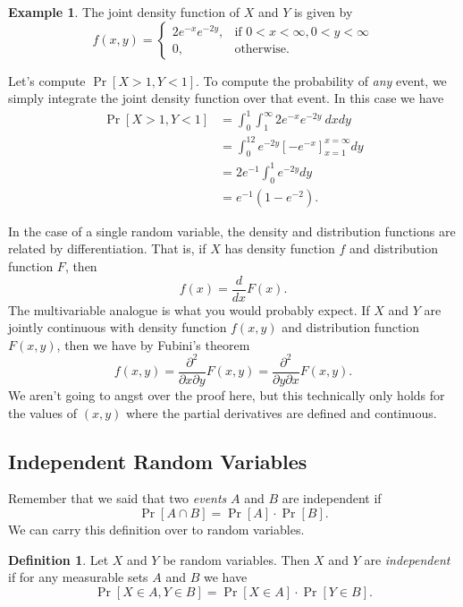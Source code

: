 \documentclass[12pt]{article}
\theoremstyle{plain}
\theoremstyle{definition}
\newtheorem{definition}[theorem]{Definition}
\newtheorem{example}[theorem]{Example}
\theoremstyle{remark}
\begin{document}
\begin{example}
    The joint density function of $X$ and $Y$ is given by
    \[
        f(x,y) = \begin{cases}
            2e^{-x}e^{-2y},&\text{if }0<x<\infty, 0<y<\infty\\
            0,&\text{otherwise.}
        \end{cases}
    \]

    Let's compute $\Pr[X>1, Y<1]$.
    To compute the probability of \emph{any} event, we simply integrate the joint density function over that event.
    In this case we have
    \begin{align*}
        \Pr[X > 1, Y< 1] &= \int_0^1\int_1^\infty2e^{-x}e^{-2y}\ dxdy\\
        &= \int_0^12e^{-2y}\left[-e^{-x}\right]_{x=1}^{x=\infty}dy\\
        &= 2e^{-1}\int_0^1e^{-2y}dy\\
        &= e^{-1}(1-e^{-2}).
    \end{align*}
\end{example}

In the case of a single random variable, the density and distribution functions are related by differentiation.
That is, if $X$ has density function $f$ and distribution function $F$, then
\[
    f(x) = \frac{d}{dx}F(x).
\]
The multivariable analogue is what you would probably expect.
If $X$ and $Y$ are jointly continuous with density function $f(x,y)$ and distribution function $F(x,y)$, then we have by Fubini's theorem
\begin{equation}\label{derivative of distribution is density}
    f(x,y) = \frac{\partial^2}{\partial x \partial y}F(x,y) = \frac{\partial^2}{\partial y\partial x}F(x,y).
\end{equation}
We aren't going to angst over the proof here, but this technically only holds for the values of $(x,y)$ where the partial derivatives are defined and continuous.










\subsection{Independent Random Variables}
Remember that we said that two \emph{events} $A$ and $B$ are independent if
\[
    \Pr[A\cap B] = \Pr[A]\cdot \Pr[B].
\]
We can carry this definition over to random variables.
\begin{definition}
    Let $X$ and $Y$ be random variables.
    Then $X$ and $Y$ are \emph{independent} if for any measurable sets $A$ and $B$ we have
    \[
        \Pr[X\in A, Y\in B] = \Pr[X\in A]\cdot \Pr[Y\in B].
    \]
\end{definition}
\end{document}
